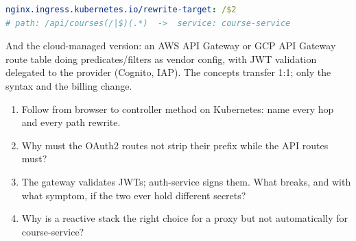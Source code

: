 \begin{lstlisting}[language=yaml]
nginx.ingress.kubernetes.io/rewrite-target: /$2
# path: /api/courses(/|$)(.*)  ->  service: course-service
\end{lstlisting}

And the cloud-managed version: an AWS API Gateway or GCP API Gateway
route table doing predicates/filters as vendor config, with JWT
validation delegated to the provider (Cognito, IAP). The concepts
transfer 1:1; only the syntax and the billing change.

\begin{quiz}
\begin{enumerate}
  \item Follow  from browser to controller
  method on Kubernetes: name every hop and every path rewrite.
  \item Why must the OAuth2 routes not strip their prefix while the API
  routes must?
  \item The gateway validates JWTs; auth-service signs them. What
  breaks, and with what symptom, if the two ever hold different secrets?
  \item Why is a reactive stack the right choice for a proxy but not
  automatically for course-service?
\end{enumerate}
\end{quiz}
